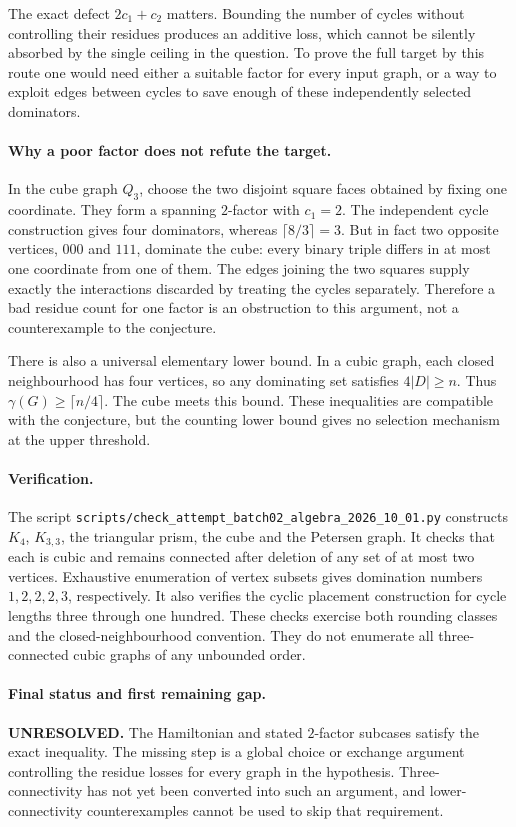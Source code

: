 \documentclass[11pt,a4paper]{article}
\begin{document}
The exact defect $2c_1+c_2$ matters. Bounding the number of cycles
without controlling their residues produces an additive loss, which
cannot be silently absorbed by the single ceiling in the question.
To prove the full target by this route one would need either a suitable
factor for every input graph, or a way to exploit edges between cycles
to save enough of these independently selected dominators.

\paragraph{Why a poor factor does not refute the target.}
In the cube graph $Q_3$, choose the two disjoint square faces obtained
by fixing one coordinate. They form a spanning $2$-factor with
$c_1=2$. The independent cycle construction gives four dominators,
whereas $\lceil8/3\rceil=3$. But in fact two opposite vertices,
$000$ and $111$, dominate the cube: every binary triple differs in
at most one coordinate from one of them. The edges joining the two
squares supply exactly the interactions discarded by treating the
cycles separately. Therefore a bad residue count for one factor is
an obstruction to this argument, not a counterexample to the conjecture.

There is also a universal elementary lower bound. In a cubic graph,
each closed neighbourhood has four vertices, so any dominating set
satisfies $4|D|\ge n$. Thus
$\gamma(G)\ge\lceil n/4\rceil$. The cube meets this bound. These
inequalities are compatible with the conjecture, but the counting lower
bound gives no selection mechanism at the upper threshold.

\paragraph{Verification.}
The script \texttt{scripts/check\_attempt\_batch02\_algebra\_2026\_10\_01.py}
constructs $K_4$, $K_{3,3}$, the triangular prism, the cube and the
Petersen graph. It checks that each is cubic and remains connected
after deletion of any set of at most two vertices. Exhaustive enumeration
of vertex subsets gives domination numbers $1,2,2,2,3$, respectively.
It also verifies the cyclic placement construction for cycle lengths
three through one hundred. These checks exercise both rounding classes
and the closed-neighbourhood convention. They do not enumerate all
three-connected cubic graphs of any unbounded order.

\paragraph{Final status and first remaining gap.}
\textbf{UNRESOLVED.} The Hamiltonian and stated $2$-factor subcases
satisfy the exact inequality. The missing step is a global choice or
exchange argument controlling the residue losses for every graph in
the hypothesis. Three-connectivity has not yet been converted into
such an argument, and lower-connectivity counterexamples cannot be
used to skip that requirement.
\end{document}
